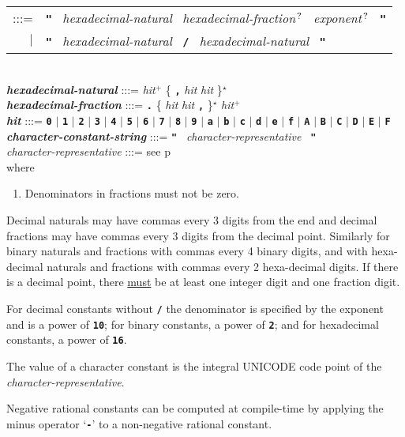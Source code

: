 \documentclass[12pt]{article}
\newcommand{\TT}[1]{{\tt \bfseries #1}}
\newcommand{\STAR}{{\Large $^\star$}}
\newcommand{\PLUS}[1][]{{$^{+#1}$}}
\newcommand{\QMARK}{{$^{\,\mbox{\footnotesize ?}}$}}
\newcommand{\emkey}[1]{{\em \bfseries #1}}
\newcommand{\pagref}[1]{p\pageref{#1}}
\newenvironment{indpar}[1][0.3in]%
	{\begin{list}{}%
		     {\setlength{\itemsep}{0in}%
		      \setlength{\topsep}{0in}%
		      \setlength{\parsep}{1ex}%
		      \setlength{\labelwidth}{#1}%
		      \setlength{\leftmargin}{#1}%
		      \addtolength{\leftmargin}{\labelsep}}%
	 \item}%
	{\end{list}}
\begin{document}
\begin{indpar}
\begin{tabular}[t]{@{}rl}
    :::= & \TT{"}~ {\em hexadecimal-natural}~
                   {\em hexadecimal-fraction}\QMARK{}~
		   {\em exponent}\QMARK{}~ \TT{"} \\
     $|$ & \TT{"}~ {\em hexadecimal-natural}~ \TT{/}~
                   {\em hexadecimal-natural}~ \TT{"} \\
    \end{tabular}
\\[0.5ex]
\emkey{hexadecimal-natural}
    :::= {\em hit}\PLUS{}
           \{ \TT{,} {\em hit} {\em hit} \}\STAR{} \\
\emkey{hexadecimal-fraction} :::=
    \TT{.} \{ {\em hit} {\em hit} \TT{,} \}\STAR{}
    {\em hit}\PLUS{} \\
\emkey{hit} :::= \TT{0} $|$ \TT{1} $|$ \TT{2} $|$ \TT{3} $|$ \TT{4}
	     $|$ \TT{5} $|$ \TT{6} $|$ \TT{7} $|$ \TT{8} $|$ \TT{9}
	     $|$ \TT{a} $|$ \TT{b} $|$ \TT{c} $|$ \TT{d} $|$ \TT{e} $|$ \TT{f}
	     $|$ \TT{A} $|$ \TT{B} $|$ \TT{C} $|$ \TT{D} $|$ \TT{E} $|$ \TT{F}
\\[0.5ex]
\emkey{character-constant-string} :::=
	\TT{"}~ {\em character-representative}~ \TT{"}
\\[0.5ex]
{\em character-representative} :::= see \pagref{CHARACTER-REPRESENTATIVE}
\\[1ex]
where
\begin{enumerate}
\item Denominators in fractions must not be zero.
\end{enumerate}

\end{indpar}

Decimal naturals may have commas
every 3 digits from the end and decimal fractions may have
commas every 3 digits from the decimal point.
Similarly for binary naturals and fractions with commas every 4 binary
digits,
and with hexa-decimal naturals and fractions with commas every 2
hexa-decimal digits.
If there is a decimal point, there \underline{must}
be at least one integer digit and
one fraction digit.

For decimal constants without \TT{/} the denominator is specified by the
exponent and is a power of \TT{10}; for
binary constants, a power of \TT{2}; and for
hexadecimal constants, a power of \TT{16}.

The value of a character constant is the integral UNICODE code point of the
{\em character-representative}.

Negative rational constants can be computed at compile-time by applying
the minus operator `\TT{-}' to a non-negative rational constant.
\end{document}
